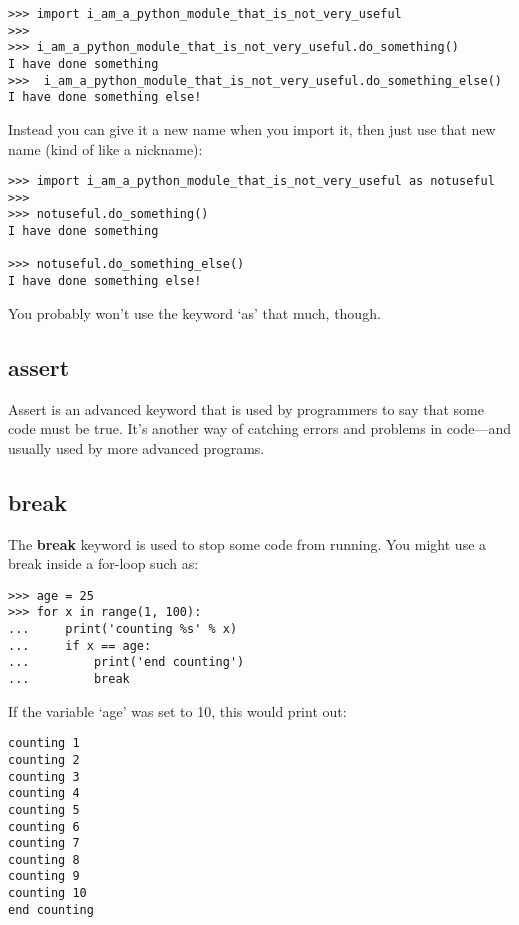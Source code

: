 \begin{Verbatim}[frame=single]
>>> import i_am_a_python_module_that_is_not_very_useful
>>>
>>> i_am_a_python_module_that_is_not_very_useful.do_something()
I have done something
>>>  i_am_a_python_module_that_is_not_very_useful.do_something_else()
I have done something else!
\end{Verbatim}

\noindent
Instead you can give it a new name when you import it, then just use that new name (kind of like a nickname):

\begin{Verbatim}[frame=single]
>>> import i_am_a_python_module_that_is_not_very_useful as notuseful
>>>
>>> notuseful.do_something()
I have done something

>>> notuseful.do_something_else()
I have done something else!
\end{Verbatim}

\noindent
You probably won't use the keyword `as' that much, though.

\subsection*{assert}

Assert is an advanced keyword that is used by programmers to say that some code must be true. It's another way of catching errors and problems in code---and usually used by more advanced programs.

\subsection*{break}

The \textbf{break} keyword is used to stop some code from running. You might use a break inside a for-loop such as:

\begin{Verbatim}[frame=single]
>>> age = 25
>>> for x in range(1, 100):
...     print('counting %s' % x)
...     if x == age:
...         print('end counting')
...         break
\end{Verbatim}

\noindent
If the variable `age' was set to 10, this would print out:

\begin{Verbatim}[frame=single]
counting 1
counting 2
counting 3
counting 4
counting 5
counting 6
counting 7
counting 8
counting 9
counting 10
end counting
\end{Verbatim}

